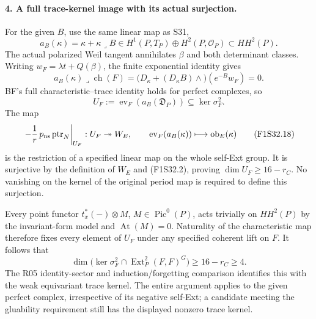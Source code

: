 \paragraph{4. A full trace-kernel image with its actual surjection.}
For the given $B$, use the same linear map as S31,
\[
 a_B(\kappa)=\kappa+\kappa\mathbin{\lrcorner}B
 \in H^1(P,T_P)\oplus H^2(P,\mathcal O_P)\subset HH^2(P).
\]
The actual polarized Weil tangent annihilates
$\beta$ and both determinant classes.
Writing $w_F=\lambda t+Q(\beta)$, the finite
exponential identity gives
\[
 a_B(\kappa)\mathbin{\lrcorner}\operatorname{ch}(F)
  =\bigl(D_\kappa+(D_\kappa B)\wedge\bigr)
                      (e^{-B}w_F)=0.
 \tag{F1S32.17}
\]
BF's full characteristic--trace identity holds for
perfect complexes, so
\[
 U_F:=\operatorname{ev}_F(a_B(\mathfrak D_P))
                  \subseteq\ker\sigma_F^2.
\]
The map
\[
 \left.-\frac1r\,p_{\rm ns}\operatorname{ptr}_N\right|_{U_F}:
 U_F\twoheadrightarrow W_E,\qquad
 \operatorname{ev}_F(a_B(\kappa))
                         \longmapsto\operatorname{ob}_E(\kappa)
 \tag{F1S32.18}
\]
is the restriction of a specified linear map on
the whole self-Ext group.
It is surjective by the definition of $W_E$ and
(F1S32.2), proving $\dim U_F\ge16-r_C$.
No vanishing on the kernel of the original
period map is required to define this surjection.

Every point functor $t_x^*(-)\otimes M$,
$M\in\operatorname{Pic}^0(P)$, acts trivially on
$HH^2(P)$ by the invariant-form model and
$\operatorname{At}(M)=0$.
Naturality of the characteristic map therefore
fixes every element of $U_F$ under any specified
coherent lift on $F$.
It follows that
\[
 \dim\bigl(\ker\sigma_F^2\cap
                      \operatorname{Ext}^2_P(F,F)^G\bigr)
                              \ge16-r_C\ge4.
 \tag{F1S32.19}
\]
The R05 identity-sector and induction/forgetting
comparison identifies this with the weak
equivariant trace kernel. The entire argument
applies to the given perfect complex, irrespective
of its negative self-Ext; a candidate meeting the
gluability requirement still has the displayed
nonzero trace kernel.

